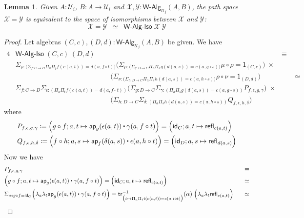 \documentclass[11pt]{article}
\newcommand{\X}{\mathcal{X}}
\newcommand{\Y}{\mathcal{Y}}
\newcommand{\comp}{\circ}
\newcommand{\idfun}[1]{\mathsf{id}_{#1}}
\newcommand{\prd}[1]{\Pi_{#1}}
\newcommand{\sm}[1]{\Sigma_{#1}}
\newcommand{\lam}[1]{\lambda_{#1}}
\newcommand{\defeq}{\coloneqq}
\newcommand{\refl}{\mathsf{refl}}
\newcommand{\one}{\mathsf{1}}
\newcommand{\UU}{\mathcal{U}}
\newcommand{\WAlg}{\mathsf{W}\text{-}\mathsf{Alg}}
\newcommand{\app}{\mathsf{ap}}
\newcommand{\trans}{\mathsf{tr}}
\newcommand{\WAlgIso}{\mathsf{W}\text{-}\mathsf{Alg}\text{-}\mathsf{Iso}}
\newcommand{\ct}{%
  \mathchoice{\mathbin{\raisebox{0.5ex}{$\displaystyle\centerdot$}}}%
             {\mathbin{\raisebox{0.5ex}{$\centerdot$}}}%
             {\mathbin{\raisebox{0.25ex}{$\scriptstyle\,\centerdot\,$}}}%
             {\mathbin{\raisebox{0.1ex}{$\scriptscriptstyle\,\centerdot\,$}}}}
\newtheorem{lemma}[theorem]{Lemma}
\theoremstyle{definition}
\begin{document}
\begin{lemma}\label{WAlgSpace}
Given $A:\UU_i$, $B : A \to \UU_i$ and $\X,\Y : \WAlg_{\UU_j}(A,B)$, the path space $\X = \Y$ is equivalent to the space of isomorphisms between $\X$ and $\Y$:
\[ \X = \Y \;\; \simeq \;\; \WAlgIso \; \X \; \Y \] 
\end{lemma}
\begin{proof}
Let algebras $(C,c), (D,d) : \WAlg_{\UU_j}(A,B)$ be given. We have
\begin{alignat*}{4}
& \WAlgIso \; (C,c) \; (D,d) & \equiv \\
& \sm{\rho : \big(\sm{f:C\to D} \prd{a}\prd{t} f(c(a,t)) = d(a,f \comp t) \big)} \Big(\sm{\mu : \big(\sm{g:D\to C} \prd{a}\prd{s} g(d(a,s)) = c(a,g \comp s)\big)} \mu \comp \rho = \one_{(C,c)} \Big)\; \times & \\
& \;\;\;\;\;\;\;\;\;\;\;\;\;\;\;\;\;\;\;\;\;\;\;\;\;\;\;\;\;\;\;\;\;\;\;\;\;\;\;\;\;\;\;\;\;\;\;\;\;\;\Big(\sm{\nu : \big(\sm{h:D\to C} \prd{a}\prd{s} h(d(a,s))=c(a,h\comp s)\big)} \rho \comp \nu = \one_{(D,d)}\Big) & \;\;\;\;\;\;\; \simeq \\
& \sm{f : C\to D} \sm{\epsilon : (\prd{a}\prd{t} f(c(a,t)) = d(a,f \comp t))} \Big(\sm{g:D\to C} \sm{\gamma : (\prd{a}\prd{s} g(d(a,s)) = c(a,g \comp s))} P_{f,\epsilon,g,\gamma}\Big) \; \times & \\
& \;\;\;\;\;\;\;\;\;\;\;\;\;\;\;\;\;\;\;\;\;\;\;\;\;\;\;\;\;\;\;\;\;\;\;\;\;\;\;\;\;\;\;\;\;\;\;\;\;\; \Big(\sm{h:D\to C} \sm{\delta : (\prd{a}\prd{s} h(d(a,s))=c(a,h\comp s))} Q_{f,\epsilon,h,\delta} \Big) &
\end{alignat*}
where
\begin{align*}
& P_{f,\epsilon,g,\gamma} \defeq \Big(g \comp f; a,t \mapsto \app_g(\epsilon(a,t)) \ct \gamma(a, f \comp t)\Big) = \Big(\idfun{C}; a,t \mapsto \refl_{c(a,t)}\Big) \\
& Q_{f,\epsilon,h,\delta} \defeq \Big(f \comp h; a,s \mapsto \app_f(\delta(a,s)) \ct \epsilon(a, h \comp t)\Big) = \Big(\idfun{D}; a,s \mapsto \refl_{d(a,s)}\Big)
\end{align*}
Now we have
\begin{alignat*}{4}
& P_{f,\epsilon,g,\gamma} & \equiv \\
& \Big(g \comp f; a,t \mapsto \app_g(\epsilon(a,t)) \ct \gamma(a, f \comp t)\Big) = \Big(\idfun{C}; a,t \mapsto \refl_{c(a,t)}\Big) & \simeq \\
& \sm{\alpha : g \comp f = \idfun{C}} \Big(\lam{a}\lam{t} \app_g(\epsilon(a,t)) \ct \gamma(a, f \comp t)\Big) = \trans^{-1}_{\big(i \mapsto \prd{a}\prd{t} i(c(a,t)) = c(a,i \comp t)\big)}(\alpha) \; \Big(\lam{a}\lam{t} \refl_{c(a,t)}\Big) & \;\;\; \simeq \\

\end{alignat*}
\end{proof}
\end{document}
